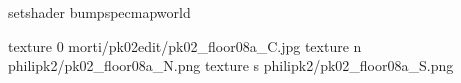setshader bumpspecmapworld

texture 0 morti/pk02edit/pk02_floor08a_C.jpg
texture n philipk2/pk02_floor08a_N.png
texture s philipk2/pk02_floor08a_S.png

